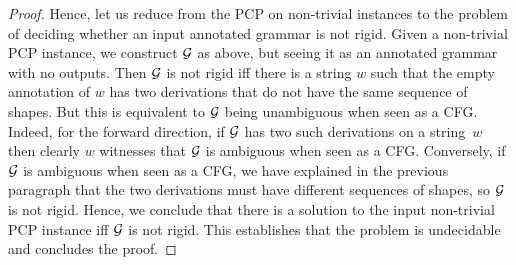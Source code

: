 \begin{proof}
  Hence, let us reduce from the PCP on non-trivial instances to the problem of
  deciding whether an input annotated grammar is not rigid. Given a
  non-trivial PCP instance, we construct $\mathcal{G}$ as above, but seeing it as an
  annotated grammar with no outputs. Then $\mathcal{G}$ is not rigid iff there is a
  string $w$ such that the empty annotation of $w$ has two derivations that do not
  have the same sequence of shapes. But this is equivalent to $\mathcal{G}$ being
  unambiguous when seen as a CFG. Indeed, for the forward direction, if $\mathcal{G}$ has
  two such derivations on a string~$w$ then clearly $w$ witnesses that $\mathcal{G}$ is
  ambiguous when seen as a CFG. Conversely, if $\mathcal{G}$ is ambiguous when seen as a
  CFG, we have explained in the previous paragraph that the two derivations must
  have different sequences of shapes, so $\mathcal{G}$ is not rigid. Hence, we
  conclude that there is a solution to the input non-trivial PCP instance iff
  $\mathcal{G}$ is not rigid. This establishes that the problem is undecidable
  and concludes the proof.
\end{proof}
